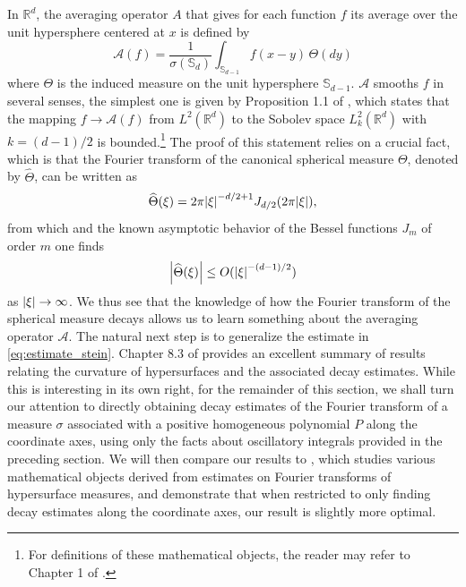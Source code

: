 \documentclass[11pt, letter]{book}
\newcommand{\f}[2]{\frac{#1}{#2}}
\begin{document}
\noindent In $\mathbb{R}^d$, the averaging operator $A$ that gives for each function $f$ its average over the unit hypersphere centered at $x$ is defined by
\begin{equation*}
    \mathcal{A}(f) = \f{1}{\sigma(\mathbb{S}_d)}\int_{\mathbb{S}_{d-1}} f(x-y)\,\Theta(dy)
\end{equation*}
where $\Theta$ is the induced measure on the unit hypersphere $\mathbb{S}_{d-1}$. $\mathcal{A}$ smooths $f$ in several senses, the simplest one is given by Proposition 1.1 of \cite{SteinFunctionalAnalysis}, which states that the mapping $f\to \mathcal{A}(f)$ from $L^2(\mathbb{R}^d)$ to the Sobolev space $L_k^2(\mathbb{R}^d)$ with $k=(d-1)/2$ is bounded.\footnote{For definitions of these mathematical objects, the reader may refer to Chapter 1 of \cite{SteinFunctionalAnalysis}.}  The proof of this statement relies on a crucial fact, which is that the Fourier transform of the canonical spherical measure $\Theta$, denoted by $\widehat{\Theta}$, can be written as
\begin{equation*}
    \widehat{\Theta}(\xi) = 2\pi \abs{\xi}^{-d/2+1}J_{d/2}(2\pi \abs{\xi}),
\end{equation*}
from which and the known asymptotic behavior of the Bessel functions $J_m$ of order $m$ one finds 
\begin{equation}\label{eq:estimate_stein}
    \abs{\widehat{\Theta}(\xi)} \leq O(\abs{\xi}^{-(d-1)/2})
\end{equation}
as $\abs{\xi} \to\infty$. We thus see that the knowledge of how the Fourier transform of the spherical measure decays allows us to learn something about the averaging operator $\mathcal{A}$. The natural next step is to generalize the estimate in \eqref{eq:estimate_stein}. Chapter 8.3 of \cite{SteinFunctionalAnalysis} provides an excellent summary of results relating the curvature of hypersurfaces and the associated decay estimates. While this is interesting in its own right, for the remainder of this section, we shall turn our attention to directly obtaining decay estimates of the Fourier transform of a measure $\sigma$ associated with a positive homogeneous polynomial $P$ along the coordinate axes, using only the facts about oscillatory integrals provided in the preceding section. We will then compare our results to \cite{greenblatt_fourier_2021}, which studies various mathematical objects derived from estimates on Fourier transforms of hypersurface measures, and demonstrate that when restricted to only finding decay estimates along the coordinate axes, our result is slightly more optimal. \\
\end{document}
